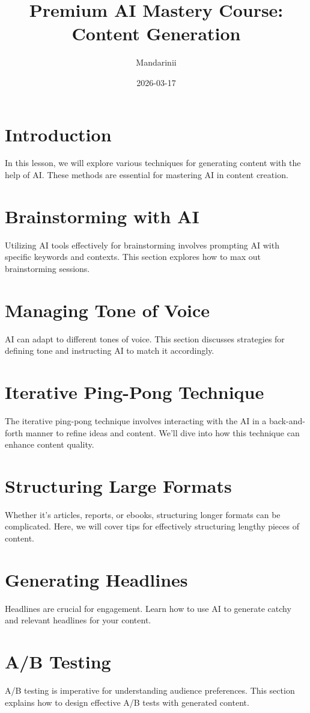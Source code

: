 \documentclass{article}
\title{Premium AI Mastery Course: Content Generation}
\author{Mandarinii}
\date{2026-03-17}
\begin{document}
\maketitle

\section{Introduction}
In this lesson, we will explore various techniques for generating content with the help of AI. These methods are essential for mastering AI in content creation.

\section{Brainstorming with AI}
Utilizing AI tools effectively for brainstorming involves prompting AI with specific keywords and contexts. This section explores how to max out brainstorming sessions.

\section{Managing Tone of Voice}
AI can adapt to different tones of voice. This section discusses strategies for defining tone and instructing AI to match it accordingly.

\section{Iterative Ping-Pong Technique}
The iterative ping-pong technique involves interacting with the AI in a back-and-forth manner to refine ideas and content. We'll dive into how this technique can enhance content quality.

\section{Structuring Large Formats}
Whether it's articles, reports, or ebooks, structuring longer formats can be complicated. Here, we will cover tips for effectively structuring lengthy pieces of content.

\section{Generating Headlines}
Headlines are crucial for engagement. Learn how to use AI to generate catchy and relevant headlines for your content.

\section{A/B Testing}
A/B testing is imperative for understanding audience preferences. This section explains how to design effective A/B tests with generated content.
\end{document}
